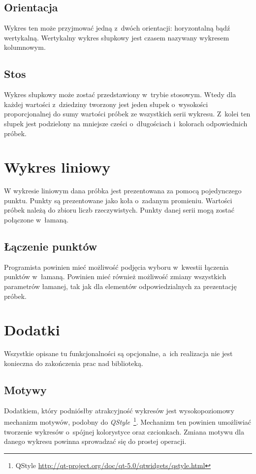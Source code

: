 \subsection{Orientacja} 
Wykres ten może przyjmować jedną z~dwóch orientacji: horyzontalną bądź wertykalną. Wertykalny wykres słupkowy jest czasem nazywany wykresem kolumnowym. 

\subsection{Stos}
Wykres słupkowy może zostać przedstawiony w~trybie stosowym. Wtedy dla każdej wartości z~dziedziny tworzony jest jeden słupek o~wysokości proporcjonalnej do sumy wartości próbek ze wszystkich serii wykresu. Z~kolei ten słupek jest podzielony na mniejsze cześci o~długościach i~kolorach odpowiednich próbek.  


\section{Wykres liniowy}
W wykresie liniowym dana próbka jest prezentowana za pomocą pojedynczego punktu. Punkty są prezentowane jako koła o~zadanym promieniu. Wartości próbek należą do zbioru liczb rzeczywistych. Punkty danej serii mogą zostać połączone w~łamaną.

\subsection{Łączenie punktów}
Programista powinien mieć możliwość podjęcia wyboru w~kwestii łączenia punktów w~łamaną. Powinien mieć również możliwość zmiany wszystkich parametrów łamanej, tak jak dla elementów odpowiedzialnych za prezentację próbek.

\section{Dodatki}
Wszystkie opisane tu funkcjonalności są opcjonalne, a~ich realizacja nie jest konieczna do zakończenia prac nad biblioteką.

\subsection{Motywy}
Dodatkiem, który podniósłby atrakcyjność wykresów jest wysokopoziomowy mechanizm motywów, podobny do \textit{QStyle}~\footnote{QStyle \url{http://qt-project.org/doc/qt-5.0/qtwidgets/qstyle.html}}. Mechanizm ten powinien umożliwiać tworzenie wykresów o~spójnej kolorystyce oraz czcionkach. Zmiana motywu dla danego wykresu powinna sprowadzać się do prostej operacji.

